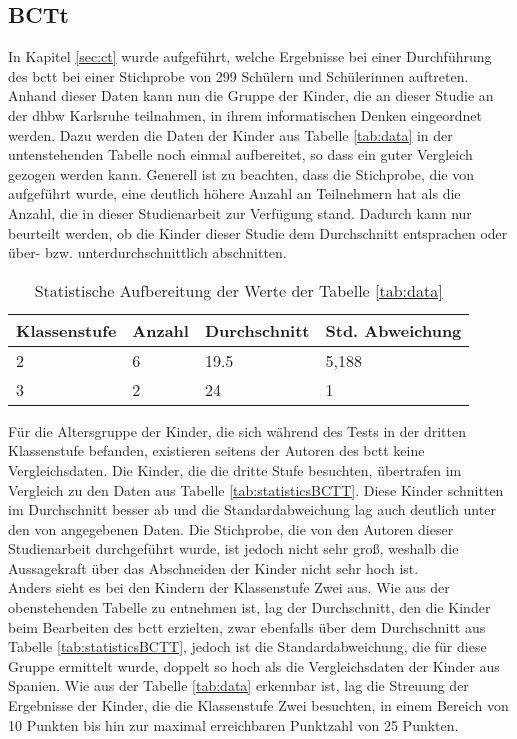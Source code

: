 	\subsection{BCTt}
	In Kapitel \ref{sec:ct} wurde aufgeführt, welche Ergebnisse bei einer Durchführung des \acrshort{bctt} bei einer Stichprobe von 299 Schülern und Schülerinnen auftreten. Anhand dieser Daten kann nun die Gruppe der Kinder, die an dieser Studie an der \acrshort{dhbw} Karlsruhe teilnahmen, in ihrem informatischen Denken eingeordnet werden. Dazu werden die Daten der Kinder aus Tabelle \ref{tab:data} in der untenstehenden Tabelle noch einmal aufbereitet, so dass ein guter Vergleich gezogen werden kann. Generell ist zu beachten, dass die Stichprobe, die von \citeauthor{bcct} aufgeführt wurde, eine deutlich höhere Anzahl an Teilnehmern hat als die Anzahl, die in dieser Studienarbeit zur Verfügung stand. Dadurch kann nur beurteilt werden, ob die Kinder dieser Studie dem Durchschnitt entsprachen oder über- bzw. unterdurchschnittlich abschnitten.
	\begin{table}[H]
		\centering
		\begin{tabular}{|l|l|l|l|}
			\hline
			\rowcolor[HTML]{C0C0C0} 
			\textbf{Klassenstufe} & \textbf{Anzahl} & \textbf{Durchschnitt} & \textbf{Std. Abweichung} \\ \hline
			2                     & 6               & 19.5                  & 5,188                    \\ \hline
			3                     & 2               & 24                    & 1                        \\ \hline
		\end{tabular}
	\label{tab:statisticAufbereitung}
	\caption{Statistische Aufbereitung der Werte der Tabelle \ref{tab:data}}
	\end{table}

	Für die Altersgruppe der Kinder, die sich während des Tests in der dritten Klassenstufe befanden, existieren seitens der Autoren des \acrshort{bctt} keine Vergleichsdaten. Die Kinder, die die dritte Stufe besuchten, übertrafen im Vergleich zu den Daten aus Tabelle \ref{tab:statisticsBCTT}. Diese Kinder schnitten im Durchschnitt besser ab und die Standardabweichung lag auch deutlich unter den von \citeauthor{bcct} angegebenen Daten. Die Stichprobe, die von den Autoren dieser Studienarbeit durchgeführt wurde, ist jedoch nicht sehr groß, weshalb die Aussagekraft über das Abschneiden der Kinder nicht sehr hoch ist.\\
	Anders sieht es bei den Kindern der Klassenstufe Zwei aus. Wie aus der obenstehenden Tabelle zu entnehmen ist, lag der Durchschnitt, den die Kinder beim Bearbeiten des \acrlong{bctt} erzielten, zwar ebenfalls über dem Durchschnitt aus Tabelle \ref{tab:statisticsBCTT}, jedoch ist die Standardabweichung, die für diese Gruppe ermittelt wurde, doppelt so hoch als die Vergleichsdaten der Kinder aus Spanien. Wie aus der Tabelle \ref{tab:data} erkennbar ist, lag die Streuung der Ergebnisse der Kinder, die die Klassenstufe Zwei besuchten, in einem Bereich von 10 Punkten bis hin zur maximal erreichbaren Punktzahl von 25 Punkten.   
